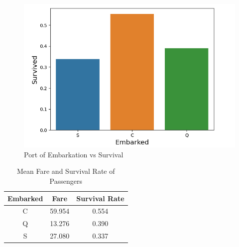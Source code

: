 \documentclass[conference]{IEEEtran}
\begin{document}
\begin{enumerate}
    \begin{figure}[htbp]
    \centerline{\includegraphics[scale = 0.56]{Port of Embarkation versus Survival.png}}
    \caption{Port of Embarkation vs Survival}
    \label{fig}
    \end{figure}
    \begin{table}[h!]
      \begin{center}
        \caption{{Mean Fare and Survival Rate of Passengers}}
        \label{tab:table1}
        \renewcommand{\arraystretch}{1.2} %
        \begin{tabular}{c|c|c} %
          \textbf{Embarked} & \textbf{Fare} & \textbf{Survival Rate}\\
          \hline
          C & 59.954 & 0.554 \\
          Q & 13.276 & 0.390 \\
          S & 27.080 & 0.337 \\
        \end{tabular}
      \end{center}
    \end{table}


\end{enumerate}
\end{document}
